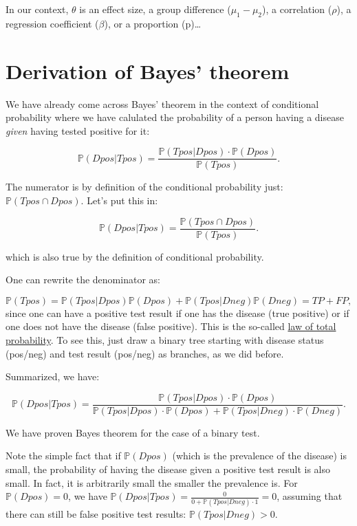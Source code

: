 \documentclass[
]{book}
\begin{document}
In our context, \(\theta\) is an effect size, a group difference (\(\mu_1 - \mu_2\)), a correlation (\(\rho\)),
a regression coefficient (\(\beta\)), or a proportion (p)\ldots{}

\section{Derivation of Bayes' theorem}\label{derivation-of-bayes-theorem}

We have already come across Bayes' theorem in the context of conditional probability where we have calulated
the probability of a person having a disease \emph{given} having tested positive for it:

\[
\mathbb{P}(Dpos|Tpos) = \frac{\mathbb{P}(Tpos|Dpos) \cdot \mathbb{P}(Dpos)}{\mathbb{P}(Tpos)}.
\]

The numerator is by definition of the conditional probability just: \(\mathbb{P}(Tpos \cap Dpos)\). Let's put this in:

\[
\mathbb{P}(Dpos|Tpos) = \frac{\mathbb{P}(Tpos \cap Dpos)}{\mathbb{P}(Tpos)}.
\]

which is also true by the definition of conditional probability.

One can rewrite the denominator as:

\[
\mathbb{P}(Tpos) = \mathbb{P}(Tpos|Dpos)\mathbb{P}(Dpos) + \mathbb{P}(Tpos|Dneg)\mathbb{P}(Dneg) = TP + FP,
\]
since one can have a positive test result if one has the disease (true positive) or if one does not have the disease (false positive).
This is the so-called \href{https://en.wikipedia.org/wiki/Law_of_total_probability}{law of total probability}.
To see this, just draw a binary tree starting with disease status (pos/neg) and test result (pos/neg) as branches, as we did before.

Summarized, we have:

\[
\mathbb{P}(Dpos|Tpos) = \frac{\mathbb{P}(Tpos|Dpos) \cdot 
\mathbb{P}(Dpos)}{\mathbb{P}(Tpos|Dpos) \cdot \mathbb{P}(Dpos) + \mathbb{P}(Tpos|Dneg) \cdot \mathbb{P}(Dneg)}.
\]

We have proven Bayes theorem for the case of a binary test.

Note the simple fact that if \(\mathbb{P}(Dpos)\) (which is the prevalence of the disease)
is small, the probability of having the disease given a positive test result is also small.
In fact, it is arbitrarily small the smaller the prevalence is.
For \(\mathbb{P}(Dpos)=0\), we have \(\mathbb{P}(Dpos|Tpos) = \frac{0}{0 + \mathbb{P}(Tpos|Dneg) \cdot 1} = 0\),
assuming that there can still be false positive test results: \(\mathbb{P}(Tpos|Dneg) > 0\).
\end{document}
